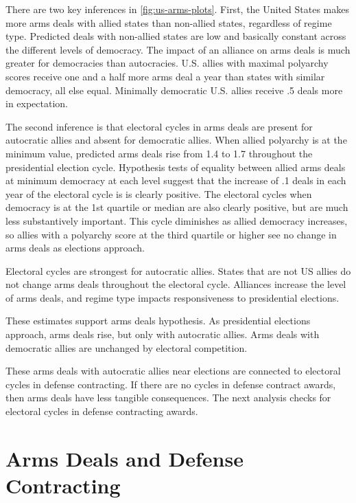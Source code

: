\documentclass[12pt]{article}
\begin{document}
There are two key inferences in \autoref{fig:us-arms-plots}.
First, the United States makes more arms deals with allied states than non-allied states, regardless of regime type. 
Predicted deals with non-allied states are low and basically constant across the different levels of democracy. 
The impact of an alliance on arms deals is much greater for democracies than autocracies.
U.S. allies with maximal polyarchy scores receive one and a half more arms deal a year than states with similar democracy, all else equal. 
Minimally democratic U.S. allies receive .5 deals more in expectation. 


The second inference is that electoral cycles in arms deals are present for autocratic allies and absent for democratic allies.
When allied polyarchy is at the minimum value, predicted arms deals rise from 1.4 to 1.7 throughout the presidential election cycle.
Hypothesis tests of equality between allied arms deals at minimum democracy at each level suggest that the increase of .1 deals in each year of the electoral cycle is is clearly positive. 
The electoral cycles when democracy is at the 1st quartile or median are also clearly positive, but are much less substantively important.
This cycle diminishes as allied democracy increases, so allies with a polyarchy score at the third quartile or higher see no change in arms deals as elections approach.  


Electoral cycles are strongest for autocratic allies. 
States that are not US allies do not change arms deals throughout the electoral cycle. 
Alliances increase the level of arms deals, and regime type impacts responsiveness to presidential elections. 


These estimates support arms deals hypothesis. 
As presidential elections approach, arms deals rise, but only with autocratic allies. 
Arms deals with democratic allies are unchanged by electoral competition.


These arms deals with autocratic allies near elections are connected to electoral cycles in defense contracting. 
If there are no cycles in defense contract awards, then arms deals have less tangible consequences. 
The next analysis checks for electoral cycles in defense contracting awards. 



\section{Arms Deals and Defense Contracting}
\end{document}
